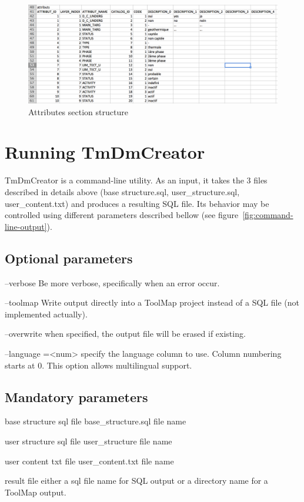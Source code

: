\documentclass[a4paper, 12pt]{article}
\begin{document}
\begin{figure} [htbp]
  \centering
  \includegraphics[width=.9\textwidth]{img/attributs.png}
  \caption{Attributes section structure}
  \label{fig:attributs}
\end{figure}

\section{Running TmDmCreator}

TmDmCreator is a command-line utility. As an input, it takes the 3 files described in details above (base structure.sql, user\_structure.sql, user\_content.txt) and produces a resulting SQL file. Its behavior may be controlled using different parameters described bellow (see figure~\ref{fig:command-line-output}).


\subsection{Optional parameters}
\begin{description*}
  \item [--verbose] Be more verbose, specifically when an error occur. 
  \item [--toolmap] Write output directly into a ToolMap project instead of a SQL file (not implemented actually). 
  \item [--overwrite] when specified, the output file will be erased if existing. 
  \item [--language =<num>] specify the language column to use. Column numbering starts at 0. This option allows multilingual support.
\end{description*}

\subsection{Mandatory parameters}
\begin{description*}
  \item [base structure sql file] base\_structure.sql file name
  \item [user structure sql file] user\_structure file name
  \item [user content txt file] user\_content.txt file name
  \item [result file] either a sql file name for SQL output or a directory name for a ToolMap output.
\end{description*}
\end{document}
